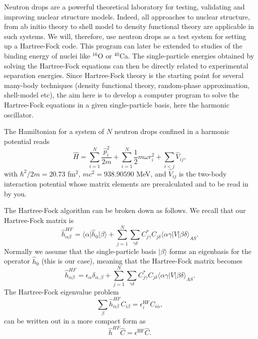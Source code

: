 \documentclass[%
oneside,                 %
final,                   %
10pt]{article}
\newenvironment{doconceexercise}{}{}
\newcounter{doconceexercisecounter}
\begin{document}
\begin{doconceexercise}

                             

Neutron drops are a powerful theoretical laboratory for testing,
validating and improving nuclear structure models. Indeed, all
approaches to nuclear structure, from ab initio theory to shell model
to density functional theory are applicable in such systems. We will,
therefore, use neutron drops as a test system for setting up a
Hartree-Fock code.  This program can later be extended to studies of
the binding energy of nuclei like $^{16}$O or $^{40}$Ca. The
single-particle energies obtained by solving the Hartree-Fock
equations can then be directly related to experimental separation
energies. 
Since Hartree-Fock theory is the starting point for
several many-body techniques (density functional theory, random-phase
approximation, shell-model etc), the aim here is to develop a computer
program to solve the Hartree-Fock equations in a given single-particle basis,
here the harmonic oscillator.

The Hamiltonian for a system of $N$ neutron drops confined in a
harmonic potential reads
\[
\hat{H} = \sum_{i=1}^{N} \frac{\hat{p}_{i}^{2}}{2m}+\sum_{i=1}^{N} \frac{1}{2} m\omega {r}_{i}^{2}+\sum_{i<j} \hat{V}_{ij},
\]
with $\hbar^{2}/2m = 20.73$ fm$^{2}$, $mc^{2} = 938.90590$ MeV, and 
$\hat{V}_{ij}$ is the two-body interaction potential whose 
matrix elements are precalculated
and to be read in by you.

The Hartree-Fock algorithm can be broken down as follows. We recall that  our Hartree-Fock matrix  is 
\[
\hat{h}_{\alpha\beta}^{HF}=\langle \alpha \vert\hat{h}_0 \vert \beta \rangle+
\sum_{j=1}^N\sum_{\gamma\delta} C^*_{j\gamma}C_{j\delta}\langle \alpha\gamma|V|\beta\delta\rangle_{AS}.
\]
Normally we assume that the single-particle basis $\vert\beta\rangle$
forms an eigenbasis for the operator $\hat{h}_0$ (this is our case), meaning that the
Hartree-Fock matrix becomes
\[
\hat{h}_{\alpha\beta}^{HF}=\epsilon_{\alpha}\delta_{\alpha,\beta}+
\sum_{j=1}^N\sum_{\gamma\delta} C^*_{j\gamma}C_{j\delta}\langle \alpha\gamma|V|\beta\delta\rangle_{AS}.
\]
The Hartree-Fock eigenvalue problem
\[
\sum_{\beta}\hat{h}_{\alpha\beta}^{HF}C_{i\beta}=\epsilon_i^{\mathrm{HF}}C_{i\alpha},
\]
can be written out in a more compact form as
\[
\hat{h}^{HF}\hat{C}=\epsilon^{\mathrm{HF}}\hat{C}. 
\]


\end{doconceexercise}
\end{document}
